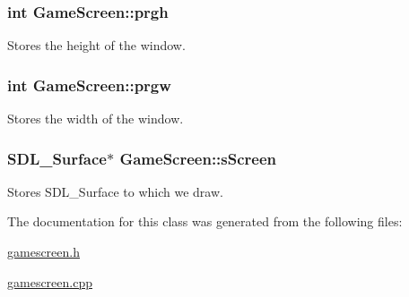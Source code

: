 \subsubsection[{prgh}]{\setlength{\rightskip}{0pt plus 5cm}int Game\+Screen\+::prgh\hspace{0.3cm}{\ttfamily [private]}}\label{classGameScreen_a9eec4473f165faa5b0464f3fd93bd49d}


Stores the height of the window. 

\hypertarget{classGameScreen_a6aff345a535677a3d955a5a40cfe3fd9}{}
\subsubsection[{prgw}]{\setlength{\rightskip}{0pt plus 5cm}int Game\+Screen\+::prgw\hspace{0.3cm}{\ttfamily [private]}}\label{classGameScreen_a6aff345a535677a3d955a5a40cfe3fd9}


Stores the width of the window. 

\hypertarget{classGameScreen_a3cccda4980b40a1ab70bee3b244f7741}{}
\subsubsection[{s\+Screen}]{\setlength{\rightskip}{0pt plus 5cm}S\+D\+L\+\_\+\+Surface$\ast$ Game\+Screen\+::s\+Screen\hspace{0.3cm}{\ttfamily [private]}}\label{classGameScreen_a3cccda4980b40a1ab70bee3b244f7741}


Stores S\+D\+L\+\_\+\+Surface to which we draw. 



The documentation for this class was generated from the following files\+:\begin{DoxyCompactItemize}
\item 
\hyperlink{gamescreen_8h}{gamescreen.\+h}\item 
\hyperlink{gamescreen_8cpp}{gamescreen.\+cpp}\end{DoxyCompactItemize}
